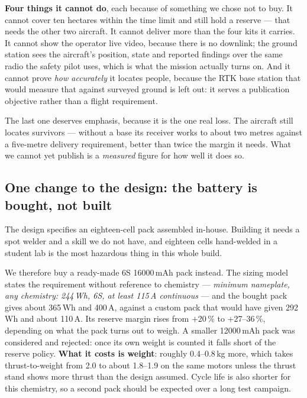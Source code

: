 \documentclass[11pt,a4paper]{article}
\begin{document}
\textbf{Four things it cannot do}, each because of something we chose not to
buy. It cannot cover ten hectares within the time limit and still hold a
reserve --- that needs the other two aircraft. It cannot deliver more than the
four kits it carries. It cannot show the operator live video, because there is
no downlink; the ground station sees the aircraft's position, state and
reported findings over the same radio the safety pilot uses, which is what the
mission actually turns on. And it cannot prove \emph{how accurately} it locates
people, because the RTK base station that would measure that against surveyed
ground is left out: it serves a publication objective rather than a flight
requirement.

The last one deserves emphasis, because it is the one real loss. The aircraft
still locates survivors --- without a base its receiver works to about two
metres against a five-metre delivery requirement, better than twice the margin it
needs. What we cannot yet
publish is a \emph{measured} figure for how well it does so.

\subsection{One change to the design: the battery is bought, not built}

The design specifies an eighteen-cell pack assembled in-house. Building it
needs a spot welder and a skill we do not have, and eighteen cells hand-welded
in a student lab is the most hazardous thing in this whole build.

We therefore buy a ready-made 6S 16000\,mAh pack instead. The sizing model
states the requirement without reference to chemistry --- \emph{minimum
nameplate, any chemistry: 244\,Wh, 6S, at least 115\,A continuous} --- and the
bought pack gives about 365\,Wh and 400\,A, against a custom pack that would
have given 292\,Wh and about 110\,A. Its reserve margin rises from $+$20\,\%
to $+$27--36\,\%, depending on what the pack turns out to weigh. A smaller 12000\,mAh pack was considered and rejected: once
its own weight is counted it falls short of the reserve policy.
\textbf{What it costs is weight}: roughly 0.4--0.8\,kg more, which takes
thrust-to-weight from 2.0 to about 1.8--1.9 on the same motors unless the
thrust stand shows more thrust than the design assumed. Cycle life is also
shorter for this chemistry, so a second pack should be expected over a long
test campaign.

\end{document}
